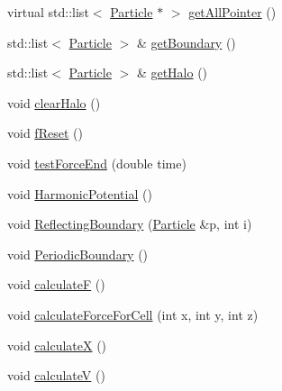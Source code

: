 \begin{DoxyCompactItemize}
virtual std\+::list$<$ \hyperlink{classParticle}{Particle} $\ast$ $>$ \hyperlink{classLinkedCellsContainer_a0b3b6c216a529189b58b05991079bb21}{get\+All\+Pointer} ()
\item 
std\+::list$<$ \hyperlink{classParticle}{Particle} $>$ \& \hyperlink{classLinkedCellsContainer_a89ebab6da4722ca5883899470183d7a3}{get\+Boundary} ()
\item 
std\+::list$<$ \hyperlink{classParticle}{Particle} $>$ \& \hyperlink{classLinkedCellsContainer_aaa470883e748eecb3f2409564402209d}{get\+Halo} ()
\item 
void \hyperlink{classLinkedCellsContainer_af8379a82b6aee0e2bc8b96db3a64f1fd}{clear\+Halo} ()
\item 
void \hyperlink{classLinkedCellsContainer_ae2ebc865c7e07122e2ab5985182d82bc}{f\+Reset} ()
\item 
void \hyperlink{classLinkedCellsContainer_a0dc45c921ad11aa2424b49ada44a0dfe}{test\+Force\+End} (double time)
\item 
void \hyperlink{classLinkedCellsContainer_a015b29c42c42a296b80775c225789f34}{Harmonic\+Potential} ()
\item 
void \hyperlink{classLinkedCellsContainer_a1975cb0083366555de77a734c0180125}{Reflecting\+Boundary} (\hyperlink{classParticle}{Particle} \&p, int i)
\item 
void \hyperlink{classLinkedCellsContainer_a0631cf4c5fbcf26b2f283634cbe0003b}{Periodic\+Boundary} ()
\item 
void \hyperlink{classLinkedCellsContainer_aaccb110aaed18cb2986a51e970e86fa4}{calculateF} ()
\item 
void \hyperlink{classLinkedCellsContainer_abacc626c54d71416ed4def4378fe74c4}{calculate\+Force\+For\+Cell} (int x, int y, int z)
\item 
void \hyperlink{classLinkedCellsContainer_ad2862569c3377347adfc06964ab7d966}{calculateX} ()
\item 
void \hyperlink{classLinkedCellsContainer_a5b9a6d9b726bda76160aaf7fbaffa821}{calculateV} ()
\end{DoxyCompactItemize}
